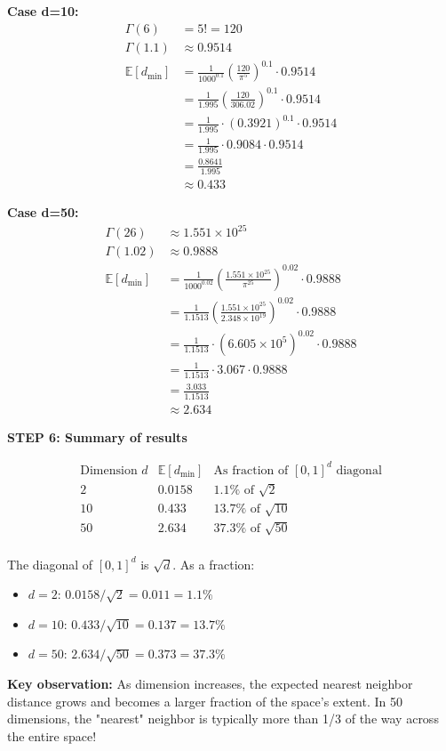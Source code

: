 \documentclass[12pt]{article}
\begin{document}
\begin{solution}
\textbf{Case d=10:}
\begin{align*}
\Gamma(6) &= 5! = 120 \\
\Gamma(1.1) &\approx 0.9514 \\
\mathbb{E}[d_{\min}] &= \frac{1}{1000^{0.1}} \left(\frac{120}{\pi^5}\right)^{0.1} \cdot 0.9514 \\
&= \frac{1}{1.995} \left(\frac{120}{306.02}\right)^{0.1} \cdot 0.9514 \\
&= \frac{1}{1.995} \cdot (0.3921)^{0.1} \cdot 0.9514 \\
&= \frac{1}{1.995} \cdot 0.9084 \cdot 0.9514 \\
&= \frac{0.8641}{1.995} \\
&\approx \boxed{0.433}
\end{align*}

\textbf{Case d=50:}
\begin{align*}
\Gamma(26) &\approx 1.551 \times 10^{25} \\
\Gamma(1.02) &\approx 0.9888 \\
\mathbb{E}[d_{\min}] &= \frac{1}{1000^{0.02}} \left(\frac{1.551 \times 10^{25}}{\pi^{25}}\right)^{0.02} \cdot 0.9888 \\
&= \frac{1}{1.1513} \left(\frac{1.551 \times 10^{25}}{2.348 \times 10^{19}}\right)^{0.02} \cdot 0.9888 \\
&= \frac{1}{1.1513} \cdot (6.605 \times 10^5)^{0.02} \cdot 0.9888 \\
&= \frac{1}{1.1513} \cdot 3.067 \cdot 0.9888 \\
&= \frac{3.033}{1.1513} \\
&\approx \boxed{2.634}
\end{align*}

\textbf{STEP 6: Summary of results}

\[
\begin{array}{c|c|c}
\text{Dimension } d & \mathbb{E}[d_{\min}] & \text{As fraction of } [0,1]^d \text{ diagonal} \\
\hline
2 & 0.0158 & 1.1\% \text{ of } \sqrt{2} \\
10 & 0.433 & 13.7\% \text{ of } \sqrt{10} \\
50 & 2.634 & 37.3\% \text{ of } \sqrt{50} \\
\end{array}
\]

The diagonal of \([0,1]^d\) is \(\sqrt{d}\). As a fraction:
\begin{itemize}
    \item \(d=2\): \(0.0158/\sqrt{2} = 0.011 = 1.1\%\)
    \item \(d=10\): \(0.433/\sqrt{10} = 0.137 = 13.7\%\)
    \item \(d=50\): \(2.634/\sqrt{50} = 0.373 = 37.3\%\)
\end{itemize}

\textbf{Key observation:} As dimension increases, the expected nearest neighbor distance grows and becomes a larger fraction of the space's extent. In 50 dimensions, the "nearest" neighbor is typically more than 1/3 of the way across the entire space!
\end{solution}
\end{document}
